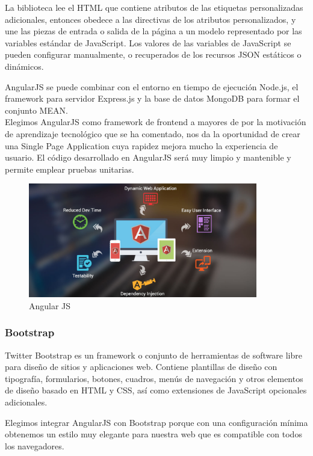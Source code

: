 \documentclass[12pt, a4paper, twoside]{book}
\begin{document}
	La biblioteca lee el HTML que contiene atributos de las etiquetas personalizadas adicionales, entonces obedece a las directivas de los atributos personalizados, y une las piezas de entrada o salida de la página a un modelo representado por las variables estándar de JavaScript. Los valores de las variables de JavaScript se pueden configurar manualmente, o recuperados de los recursos JSON estáticos o dinámicos.
	
	AngularJS se puede combinar con el entorno en tiempo de ejecución Node.js, el framework para servidor Express.js y la base de datos MongoDB para formar el conjunto MEAN.\\
	
	Elegimos AngularJS como framework de frontend a mayores de por la motivación de aprendizaje tecnológico que se ha comentado, nos da la oportunidad de crear una Single Page Application cuya rapidez mejora mucho la experiencia de usuario. El código desarrollado en AngularJS será muy limpio y mantenible y permite emplear pruebas unitarias.
	
	\begin{center}
		\begin{figure}[H]
			\centering
			\includegraphics[width=10cm]{Imagenes/angularjs.jpg}
			\caption{Angular JS}\label{angularjs}
		\end{figure}
	\end{center}
	\subsubsection{Bootstrap}    
	Twitter Bootstrap es un framework o conjunto de herramientas de software
	libre para diseño de sitios y aplicaciones web. Contiene plantillas de diseño con
	tipografía, formularios, botones, cuadros, menús de navegación y otros elementos
	de diseño basado en HTML y CSS, así como extensiones de JavaScript opcionales
	adicionales.
	
	Elegimos integrar AngularJS con Bootstrap porque con una configuración mínima obtenemos un estilo muy elegante para nuestra web que es compatible con todos los navegadores.
\end{document}
